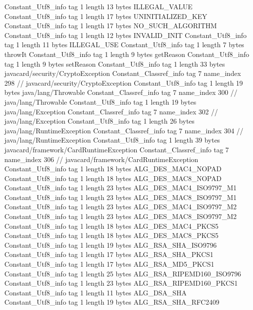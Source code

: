 {{{		}
		Constant_Utf8_info {
			tag	1
			length	13
			bytes	ILLEGAL_VALUE
		}
		Constant_Utf8_info {
			tag	1
			length	17
			bytes	UNINITIALIZED_KEY
		}
		Constant_Utf8_info {
			tag	1
			length	17
			bytes	NO_SUCH_ALGORITHM
		}
		Constant_Utf8_info {
			tag	1
			length	12
			bytes	INVALID_INIT
		}
		Constant_Utf8_info {
			tag	1
			length	11
			bytes	ILLEGAL_USE
		}
		Constant_Utf8_info {
			tag	1
			length	7
			bytes	throwIt
		}
		Constant_Utf8_info {
			tag	1
			length	9
			bytes	getReason
		}
		Constant_Utf8_info {
			tag	1
			length	9
			bytes	setReason
		}
		Constant_Utf8_info {
			tag	1
			length	33
			bytes	javacard/security/CryptoException
		}
		Constant_Classref_info {
			tag	7
			name_index	298		// javacard/security/CryptoException
		}
		Constant_Utf8_info {
			tag	1
			length	19
			bytes	java/lang/Throwable
		}
		Constant_Classref_info {
			tag	7
			name_index	300		// java/lang/Throwable
		}
		Constant_Utf8_info {
			tag	1
			length	19
			bytes	java/lang/Exception
		}
		Constant_Classref_info {
			tag	7
			name_index	302		// java/lang/Exception
		}
		Constant_Utf8_info {
			tag	1
			length	26
			bytes	java/lang/RuntimeException
		}
		Constant_Classref_info {
			tag	7
			name_index	304		// java/lang/RuntimeException
		}
		Constant_Utf8_info {
			tag	1
			length	39
			bytes	javacard/framework/CardRuntimeException
		}
		Constant_Classref_info {
			tag	7
			name_index	306		// javacard/framework/CardRuntimeException
		}
		Constant_Utf8_info {
			tag	1
			length	18
			bytes	ALG_DES_MAC4_NOPAD
		}
		Constant_Utf8_info {
			tag	1
			length	18
			bytes	ALG_DES_MAC8_NOPAD
		}
		Constant_Utf8_info {
			tag	1
			length	23
			bytes	ALG_DES_MAC4_ISO9797_M1
		}
		Constant_Utf8_info {
			tag	1
			length	23
			bytes	ALG_DES_MAC8_ISO9797_M1
		}
		Constant_Utf8_info {
			tag	1
			length	23
			bytes	ALG_DES_MAC4_ISO9797_M2
		}
		Constant_Utf8_info {
			tag	1
			length	23
			bytes	ALG_DES_MAC8_ISO9797_M2
		}
		Constant_Utf8_info {
			tag	1
			length	18
			bytes	ALG_DES_MAC4_PKCS5
		}
		Constant_Utf8_info {
			tag	1
			length	18
			bytes	ALG_DES_MAC8_PKCS5
		}
		Constant_Utf8_info {
			tag	1
			length	19
			bytes	ALG_RSA_SHA_ISO9796
		}
		Constant_Utf8_info {
			tag	1
			length	17
			bytes	ALG_RSA_SHA_PKCS1
		}
		Constant_Utf8_info {
			tag	1
			length	17
			bytes	ALG_RSA_MD5_PKCS1
		}
		Constant_Utf8_info {
			tag	1
			length	25
			bytes	ALG_RSA_RIPEMD160_ISO9796
		}
		Constant_Utf8_info {
			tag	1
			length	23
			bytes	ALG_RSA_RIPEMD160_PKCS1
		}
		Constant_Utf8_info {
			tag	1
			length	11
			bytes	ALG_DSA_SHA
		}
		Constant_Utf8_info {
			tag	1
			length	19
			bytes	ALG_RSA_SHA_RFC2409
}}}
